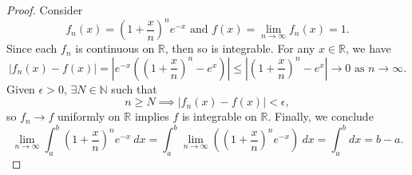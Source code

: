 \begin{Exercise}
\begin{proof}
Consider $$f_n(x) = \left( 1+\frac{x}{n} \right)^n e^{-x}\text{ and } f(x)=\lim_{n\to\infty}f_n(x) = 1.$$
Since each $f_n$ is continuous on $\mathbb{R}$, then so is integrable.
For any $x\in\mathbb{R}$, we have $$ \left| f_n(x) - f(x) \right| =
\left| e^{-x} \left( \left( 1+\frac{x}{n} \right)^n - e^x \right) \right| \leq
\left| \left( 1+\frac{x}{n} \right)^n - e^x \right|
\to0 \mbox{ as } n\to\infty.$$
Given $\epsilon > 0$, $\exists N\in\mathbb{N}$ such that $$n \geq N \implies \left| f_n(x) - f(x) \right| < \epsilon,$$
so $f_n \to f$ uniformly on $\mathbb{R}$ implies $f$ is integrable on $\mathbb{R}$. Finally, we conclude $$\lim_{n\to\infty} \int_{a}^{b} \left( 1+\frac{x}{n} \right)^n e^{-x}\ dx =
\int_{a}^{b} \lim_{n\to\infty} \left( \left( 1+\frac{x}{n} \right)^n e^{-x}\right)\ dx =
\int_{a}^{b} dx =
b-a.$$
\end{proof}
\end{Exercise}